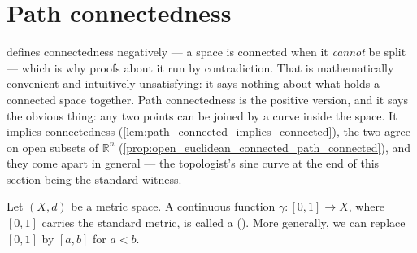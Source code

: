 \begin{center}
\end{center}


\section{Path connectedness}
\label{sec:path_connectedness}

 defines connectedness negatively --- a space is connected when it
\emph{cannot} be split --- which is why proofs about it run by contradiction. That is
mathematically convenient and intuitively unsatisfying: it says nothing about what holds a
connected space together. Path connectedness is the positive version, and it says the obvious
thing: any two points can be joined by a curve inside the space. It implies connectedness
(\cref{lem:path_connected_implies_connected}), the two agree on open subsets of $\mathbb{R}^n$
(\cref{prop:open_euclidean_connected_path_connected}), and they come apart in general --- the
topologist's sine curve at the end of this section being the standard witness.

\begin{definition}[Path]
\label{def:path}
Let $(X,d)$ be a metric space. A continuous function $\gamma : [0,1] \to X$, where $[0,1]$
carries the standard metric, is called a  (). More generally, we
can replace $[0,1]$ by $[a,b]$ for $a < b$.
\end{definition}

